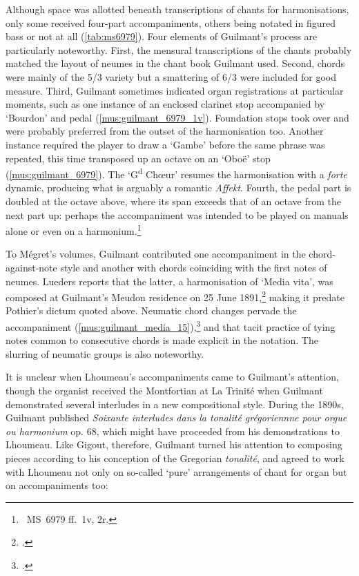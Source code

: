 Although space was allotted beneath transcriptions of chants for harmonisations, only some received four-part accompaniments, others being notated in figured bass or not at all (\cref{tab:ms6979}).
Four elements of Guilmant's process are particularly noteworthy.
First, the mensural transcriptions of the chants probably matched the layout of neumes in the chant book Guilmant used.
Second, chords were mainly of the 5/3 variety but a smattering of 6/3 were included for good measure.
Third, Guilmant sometimes indicated organ registrations at particular moments, such as one instance of an enclosed clarinet stop accompanied by `Bourdon' and pedal (\cref{mus:guilmant_6979_1v}).
Foundation stops took over and were probably preferred from the outset of the harmonisation too.
Another instance required the player to draw a `Gambe' before the same phrase was repeated, this time transposed up an octave on an `Oboë' stop (\cref{mus:guilmant_6979}).
The `G\textsuperscript{d} Chœur' resumes the harmonisation with a \emph{forte} dynamic, producing what is arguably a romantic \emph{Affekt}.
Fourth, the pedal part is doubled at the octave above, where its span exceeds that of an octave from the next part up: perhaps the accompaniment was intended to be played on manuals alone or even on a harmonium.\footnote{\bnf{}~MS~6979 ff.~1v, 2r.}

To Mégret's volumes, Guilmant contributed one accompaniment in the chord-against-note style and another with chords coinciding with the first notes of neumes.
Lueders reports that the latter, a harmonisation of `Media vita', was composed at Guilmant's Meudon residence on 25 June 1891,\footcite[p.~695 \S{}32; Guilmant's `Media vita' is preserved in \covid{}\bnf{}~MS~17194, on which the date and place of composition are reported to have been preserved.]{LuedersAlexandreGuilmant18372002} making it predate Pothier's dictum quoted above.
Neumatic chord changes pervade the accompaniment (\cref{mus:guilmant_media_15}),\footnote{\cite[1:15]{Melodieschantgregorien1892}.} and that tacit practice of tying notes common to consecutive chords is made explicit in the notation.
The slurring of neumatic groups is also noteworthy.

It is unclear when Lhoumeau's accompaniments came to Guilmant's attention, though the organist received the Montfortian at La Trinité when Guilmant demonstrated several interludes in a new compositional style.
During the 1890s, Guilmant published \emph{Soixante interludes dans la tonalité grégoriennne pour orgue ou harmonium} op. 68, which might have proceeded from his demonstrations to Lhoumeau.
Like Gigout, therefore, Guilmant turned his attention to composing pieces according to his conception of the Gregorian \emph{tonalité}, and agreed to work with Lhoumeau not only on so-called `pure' arrangements of chant for organ but on accompaniments too:
\noclub[2]

